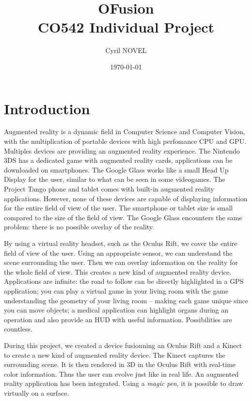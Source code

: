 \documentclass[12pt]{article}
\title{OFusion\\
\large{CO542 Individual Project}}
\author{Cyril NOVEL}
\date{\today}
\begin{document}
\maketitle
\newpage

\tableofcontents

\newpage

\section*{Introduction}
Augmented reality is a dynamic field in Computer Science and Computer Vision, with the multiplication of portable devices with high perfomance CPU and GPU. Multiples devices are providing an augmented reality experience. The Nintendo 3DS has a dedicated game with augmented reality cards, applications can be downloaded on smartphones. The Google Glass works like a small Head Up Display for the user, similar to what can be seen in some videogames. The Project Tango phone and tablet comes with built-in augmented reality applications. However, none of these devices are capable of displaying information for the entire field of view of the user. The smartphone or tablet size is small compared to the size of the field of view. The Google Glass encounters the same problem: there is no possible overlay of the reality.

By using a virtual reality headset, such as the Oculus Rift, we cover the entire field of view of the user. Using an appropriate sensor, we can understand the scene surrounding the user. Then we can overlay information on the reality for the whole field of view. This creates a new kind of augmented reality device. Applications are infinite: the road to follow can be directly highlighted in a GPS application; you can play a virtual game in your living room with the game understanding the geometry of your living room -- making each game unique since you can move objects; a medical application can highlight organs during an operation and also provide an HUD with useful information. Possibilities are countless.

During this project, we created a device fusionning an Oculus Rift and a Kinect to create a new kind of augmented reality device. The Kinect captures the surrounding scene. It is then rendered in 3D in the Oculus Rift with real-time color information. Thus the user can evolve just like in real life. An augmented reality application has been integrated. Using a \textit{magic pen}, it is possible to draw virtually on a surface.
\newpage
\end{document}
